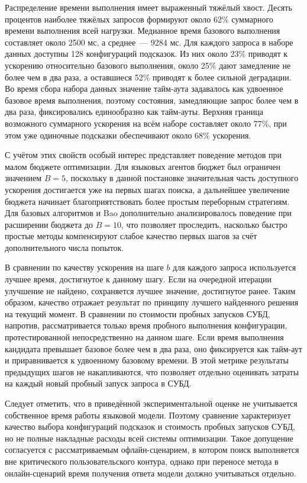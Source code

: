 Распределение времени выполнения имеет выраженный тяжёлый хвост. Десять процентов наиболее тяжёлых запросов формируют около 62\% суммарного времени выполнения всей нагрузки. Медианное время базового выполнения составляет около 2500 мс, а среднее~--- 9284 мс. Для каждого запроса в наборе данных доступны 128 конфигураций подсказок. Из них около 23\% приводят к ускорению относительно базового выполнения, около 25\% дают замедление не более чем в два раза, а оставшиеся 52\% приводят к более сильной деградации. Во время сбора набора данных значение тайм-аута задавалось как удвоенное базовое время выполнения, поэтому состояния, замедляющие запрос более чем в два раза, фиксировались единообразно как тайм-ауты. Верхняя граница возможного суммарного ускорения на всём наборе составляет около 77\%, при этом уже одиночные подсказки обеспечивают около 68\% ускорения.

С учётом этих свойств особый интерес представляет поведение методов при малом бюджете оптимизации. Для языковых агентов бюджет был ограничен значением \(B=5\), поскольку в данной постановке значительная часть доступного ускорения достигается уже на первых шагах поиска, а дальнейшее увеличение бюджета начинает благоприятствовать более простым переборным стратегиям. Для базовых алгоритмов и Bao дополнительно анализировалось поведение при расширении бюджета до \(B=10\), что позволяет проследить, насколько быстро простые методы компенсируют слабое качество первых шагов за счёт дополнительного числа попыток.

В сравнении по качеству ускорения на шаге \(b\) для каждого запроса используется лучшее время, достигнутое к данному шагу. Если на очередной итерации улучшение не найдено, сохраняется лучшее значение, достигнутое ранее. Таким образом, качество отражает результат по принципу лучшего найденного решения на текущий момент. В сравнении по стоимости пробных запусков СУБД, напротив, рассматривается только время пробного выполнения конфигурации, протестированной непосредственно на данном шаге. Если время выполнения кандидата превышает базовое более чем в два раза, оно фиксируется как тайм-аут и приравнивается к удвоенному базовому времени. В этой метрике результаты предыдущих шагов не накапливаются, что позволяет отдельно оценивать затраты на каждый новый пробный запуск запроса в СУБД.

Следует отметить, что в приведённой экспериментальной оценке не учитывается собственное время работы языковой модели. Поэтому сравнение характеризует качество выбора конфигураций подсказок и стоимость пробных запусков СУБД, но не полные накладные расходы всей системы оптимизации. Такое допущение согласуется с рассматриваемым офлайн-сценарием, в котором поиск выполняется вне критического пользовательского контура, однако при переносе метода в онлайн-сценарий время получения ответа модели должно учитываться отдельно.

